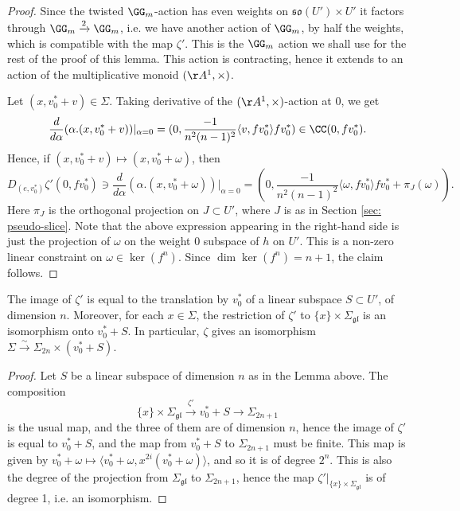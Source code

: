 \documentclass[11pt]{article}
\begin{document}
\begin{proof}
Since the twisted $\GG_m$-action has even weights on $\mathfrak{so}(U')\times U'$ it factors through $\GG_m\xrightarrow{2}\GG_m$, i.e. we have another action of $\GG_m$, by half the weights, which is compatible with the map $\zeta'$. This is the $\GG_m$ action we shall use for the rest of the proof of this lemma. This action is contracting, hence it extends to an action of the multiplicative monoid $(\AA^1,\times)$.

Let $(x, v_0^*+v)\in \Sigma$. Taking derivative of the $(\AA^1,\times)$-action at $0$, we get
$$\frac{d}{d\alpha}(\alpha.(x, v_0^*+v))|_{\alpha=0} = (0, \frac{-1}{n^2(n-1)^2}\langle v, fv_0^*\rangle fv_0^*) \in \CC(0, fv_0^*).$$
Hence, if $(x,v_0^*+v)\mapsto (x, v_0^*+\omega)$, then
\begin{equation}\label{eq: linear constraint}
    D_{(e,v_0^*)}\zeta'(0, fv_0^*)\ni \frac{d}{d\alpha}(\alpha.(x, v_0^*+\omega))|_{\alpha=0} = (0, \frac{-1}{n^2(n-1)^2}\langle \omega, fv_0^*\rangle fv_0^* + \pi_J(\omega)).
\end{equation}
Here $\pi_J$ is the orthogonal projection on $J\subset U'$, where $J$ is as in Section \ref{sec: pseudo-slice}.
Note that the above expression appearing in the right-hand side is just the projection of $\omega$ on the weight 0 subspace of $h$ on $U'$.
This is a non-zero linear constraint on $\omega\in \ker(f^n)$. Since $\dim \ker(f^n)=n+1$, the claim follows.
\end{proof}
\begin{corollary}\label{cor: pointwise isomorphism}
    The image of $\zeta'$ is equal to the translation by $v_0^*$ of a linear subspace $S\subset U'$, of dimension $n$. Moreover, for each $x\in \Sigma$, the restriction of $\zeta'$ to $\{x\}\times \Sigma_\mathfrak{gl}$ is an isomorphism onto $v_0^*+S$. In particular, $\zeta$ gives an isomorphism $\Sigma\xrightarrow{\sim} \Sigma_{2n}\times (v_0^*+S)$.
\end{corollary}
\begin{proof}
    Let $S$ be a linear subspace of dimension $n$ as in the Lemma above. The composition $$\{x\}\times \Sigma_\mathfrak{gl}\xrightarrow{\zeta'} v_0^*+S \to \Sigma_{2n+1}$$ is the usual map, and the three of them are of dimension $n$, hence the image of $\zeta'$ is equal to $v_0^*+S$, and the map from $v_0^*+S$ to $\Sigma_{2n+1}$ must be finite. This map is given by $v_0^*+\omega\mapsto \langle v_0^*+\omega, x^{2i} (v_0^*+\omega)\rangle$, and so it is of degree $2^n$. This is also the degree of the projection from $\Sigma_\mathfrak{gl}$ to $\Sigma_{2n+1}$, hence the map $\zeta'|_{\{x\}\times \Sigma_\mathfrak{gl}}$ is of degree 1, i.e. an isomorphism.
\end{proof}
\end{document}
